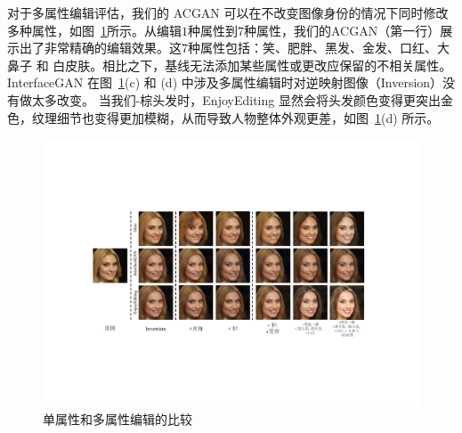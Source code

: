 对于多属性编辑评估，我们的 ACGAN 可以在不改变图像身份的情况下同时修改多种属性，如图~\ref{fig:face}所示。从编辑$1$种属性到$7$种属性，我们的ACGAN（第一行）展示出了非常精确的编辑效果。这$7$种属性包括：笑、肥胖、黑发、金发、口红、大鼻子 和 白皮肤。相比之下，基线无法添加某些属性或更改应保留的不相关属性。 InterfaceGAN 在图~\ref{fig:face}(c) 和 (d) 中涉及多属性编辑时对逆映射图像（Inversion）没有做太多改变。 当我们-棕头发时，EnjoyEditing 显然会将头发颜色变得更突出金色，纹理细节也变得更加模糊，从而导致人物整体外观更差，如图~\ref{fig:face}(d) 所示。

\begin{figure}[!t]
     \begin{center}
        \includegraphics[width=1\linewidth]{figures/ACGAN/FaceMulti_center.pdf}
     \end{center}
     \caption{单属性和多属性编辑的比较}
     \label{fig:face}
\end{figure}

